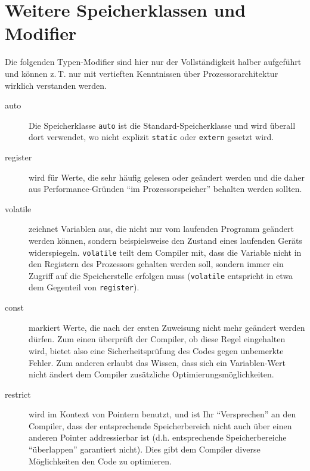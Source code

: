 \section{Weitere Speicherklassen und Modifier}
Die folgenden Typen-Modifier sind hier nur der Vollständigkeit halber aufgeführt und können z.\,T. nur mit vertieften Kenntnissen über Prozessorarchitektur wirklich verstanden werden.
\begin{description}
\item[auto] Die Speicherklasse \texttt{auto} ist die Standard-Speicherklasse und wird überall
	dort verwendet, wo nicht explizit \texttt{static} oder \texttt{extern} gesetzt wird.
\item[register] wird für Werte, die sehr häufig gelesen oder geändert werden und die daher aus
	Performance-Gründen \enquote{im Prozessorspeicher} behalten werden sollten.
\item[volatile] zeichnet Variablen aus, die nicht nur vom laufenden Programm geändert werden können,
	sondern beispielsweise den Zustand eines laufenden Geräts widerspiegeln.  \texttt{volatile} teilt dem Compiler mit, dass die Variable nicht in den Registern des Prozessors gehalten werden soll, sondern immer ein Zugriff auf die Speicherstelle erfolgen muss (\texttt{volatile} entspricht in etwa dem Gegenteil von \texttt{register}).
\item[const] markiert Werte, die nach der ersten Zuweisung nicht mehr geändert werden dürfen. Zum einen
	überprüft der Compiler, ob diese Regel eingehalten wird, bietet also eine Sicherheitsprüfung des
	Codes gegen unbemerkte Fehler. Zum anderen erlaubt das Wissen, dass sich ein Variablen-Wert nicht ändert dem Compiler zusätzliche Optimierungsmöglichkeiten.
\item[restrict] wird im Kontext von Pointern benutzt, und ist Ihr \enquote{Versprechen} an den Compiler, dass der entsprechende Speicherbereich nicht auch über einen anderen Pointer addressierbar ist (d.h. entsprechende Speicherbereiche \enquote{überlappen} garantiert nicht). Dies gibt dem Compiler diverse Möglichkeiten den Code zu optimieren.
\end{description}

